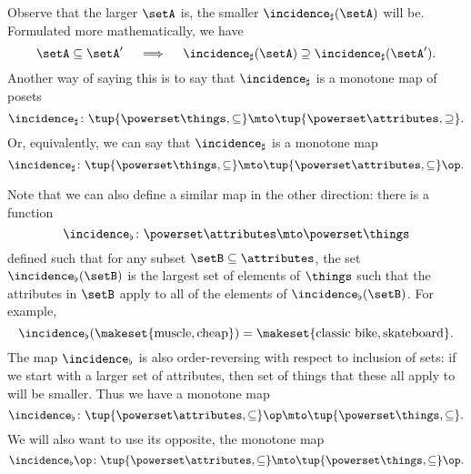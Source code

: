 Observe that the larger $\setA$ is, the smaller $\incidence_\sharp(\setA)$ will be.
Formulated more mathematically, we have
\begin{equation}\label{eq:fca-example-pushforward-7}
    \setA \subseteq \setA' \quad \implies \quad \incidence_\sharp(\setA) \supseteq \incidence_\sharp(\setA').
\end{equation}
Another way of saying this is to say that $\incidence_\sharp$ is a monotone map of posets
\begin{equation}\label{eq:fca-example-pushforward-8}
    \incidence_\sharp \colon \tup{\powerset \things, \subseteq} \mto \tup{\powerset \attributes, \supseteq}.
\end{equation}
Or, equivalently, we can say that $\incidence_\sharp$ is a monotone map
\begin{equation}\label{eq:fca-example-pushforward-9}
    \incidence_\sharp \colon \tup{\powerset \things, \subseteq} \mto \tup{\powerset \attributes, \subseteq}\op.
\end{equation}

Note that we can also define a similar map in the other direction: there is a function
\begin{equation}\label{eq:fca-example-pullback-1}
    \incidence_\flat \colon \powerset \attributes \mto \powerset \things
\end{equation}
defined such that for any subset $\setB \subseteq \attributes$, the set $\incidence_\flat(\setB)$ is the largest set of elements of $\things$ such that the attributes in $\setB$ apply to all of the elements of $\incidence_\flat(\setB)$.
For example,
\begin{equation}\label{eq:fca-example-pullback-2}
    \incidence_\flat(\makeset{\text{muscle}, \text{cheap}}) = \makeset{\text{classic bike}, \text{skateboard}}.
\end{equation}
The map $\incidence_\flat$ is also order-reversing with respect to inclusion of sets: if we start with a larger set of attributes, then set of things that these all apply to will be smaller.
Thus we have a monotone map
\begin{equation}\label{eq:fca-example-pullback-3}
    \incidence_\flat \colon \tup{\powerset \attributes, \subseteq}\op \mto \tup{\powerset \things, \subseteq}.
\end{equation}
We will also want to use its opposite, the monotone map
\begin{equation}\label{eq:fca-example-pullback-4}
    \incidence_\flat\op \colon \tup{\powerset \attributes, \subseteq} \mto \tup{\powerset \things, \subseteq}\op.
\end{equation}

